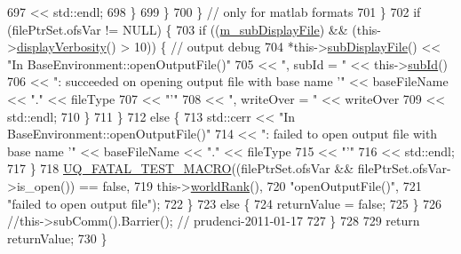 \begin{DoxyCode}
697                                       << std::endl;
698             \}
699           \}
700         \} \textcolor{comment}{// only for matlab formats}
701       \}
702       \textcolor{keywordflow}{if} (filePtrSet.ofsVar != NULL) \{
703         \textcolor{keywordflow}{if} ((\hyperlink{class_q_u_e_s_o_1_1_base_environment_a52b4275aa8ee85994dd304d9fe95c9c5}{m\_subDisplayFile}) && (this->\hyperlink{class_q_u_e_s_o_1_1_base_environment_a1fe5f244fc0316a0ab3e37463f108b96}{displayVerbosity}() > 10)) \{ \textcolor{comment}{//
       output debug}
704           *this->\hyperlink{class_q_u_e_s_o_1_1_base_environment_a8a0064746ae8dddfece4229b9ad374d6}{subDisplayFile}() << \textcolor{stringliteral}{"In BaseEnvironment::openOutputFile()"}
705                                   << \textcolor{stringliteral}{", subId = "}     << this->\hyperlink{class_q_u_e_s_o_1_1_base_environment_a6ae3174897a9b3a4c85fa18da5d4c16f}{subId}()
706                                   << \textcolor{stringliteral}{": succeeded on opening output file with base name '"} << baseFileName 
      << \textcolor{stringliteral}{"."} << fileType
707                                   << \textcolor{stringliteral}{"'"}
708                                   << \textcolor{stringliteral}{", writeOver = "} << writeOver
709                                   << std::endl;
710         \}
711       \}
712       \textcolor{keywordflow}{else} \{
713         std::cerr << \textcolor{stringliteral}{"In BaseEnvironment::openOutputFile()"}
714                   << \textcolor{stringliteral}{": failed to open output file with base name '"} << baseFileName << \textcolor{stringliteral}{"."} << fileType
715                   << \textcolor{stringliteral}{"'"}
716                   << std::endl;
717       \}
718       \hyperlink{_defines_8h_a56d63d18d0a6d45757de47fcc06f574d}{UQ\_FATAL\_TEST\_MACRO}((filePtrSet.ofsVar && filePtrSet.ofsVar->is\_open()) == \textcolor{keyword}{false},
719                           this->\hyperlink{class_q_u_e_s_o_1_1_base_environment_a78b57112bbd0e6dd0e8afec00b40ffa7}{worldRank}(),
720                           \textcolor{stringliteral}{"openOutputFile()"},
721                           \textcolor{stringliteral}{"failed to open output file"});
722     \}
723     \textcolor{keywordflow}{else} \{
724       returnValue = \textcolor{keyword}{false};
725     \}
726     \textcolor{comment}{//this->subComm().Barrier(); // prudenci-2011-01-17}
727   \}
728 
729   \textcolor{keywordflow}{return} returnValue;
730 \}
\end{DoxyCode}
